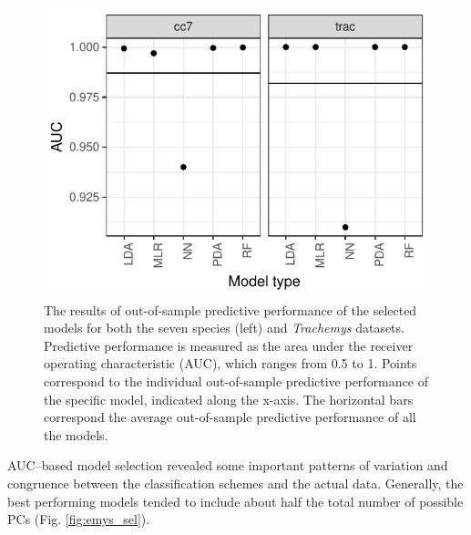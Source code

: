 \documentclass[12pt,letterpaper]{article}
\begin{document}
\begin{figure}[ht]
  \centering
  \includegraphics[height = \textheight, width = \textwidth, keepaspectratio = true]{figure/other_oos_sel}
  \caption{The results of out-of-sample predictive performance of the selected models for both the seven species (left) and \textit{Trachemys} datasets. Predictive performance is measured as the area under the receiver operating characteristic (AUC), which ranges from 0.5 to 1. Points correspond to the individual out-of-sample predictive performance of the specific model, indicated along the x-axis. The horizontal bars correspond the average out-of-sample predictive performance of all the models.}
  \label{fig:other_oos}
\end{figure}


AUC--based model selection revealed some important patterns of variation and congruence between the classification schemes and the actual data. Generally, the best performing models tended to include about half the total number of possible PCs (Fig. \ref{fig:emys_sel}). 
\end{document}
